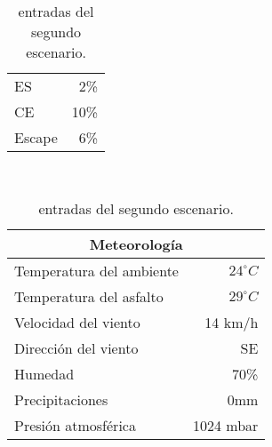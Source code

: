 \documentclass[12pt,a4paper,twoside,spanish]{article}      %
\begin{document}
\begin{table}[H]
\begin{tabular}{lr}
        ES & 2\% \\
        CE & 10\% \\
        Escape & 6\% \\ \bottomrule
    \end{tabular} \\ \vspace{1em}
    \begin{tabular}{lr}
        \toprule
        \multicolumn{2}{c}{\textbf{Meteorología}} \\ \midrule
        Temperatura del ambiente & $24^\circ C$ \\
        Temperatura del asfalto & $29^\circ C$ \\
        Velocidad del viento & 14 km/h \\
        Dirección del viento & SE \\
        Humedad & 70\% \\
        Precipitaciones & 0mm \\
        Presión atmosférica & 1024 mbar \\ \bottomrule
    \end{tabular} \\ \vspace{1em}
    \caption{entradas del segundo escenario.}
    \label{tab:in_esc_2}
\end{table}
\end{document}
